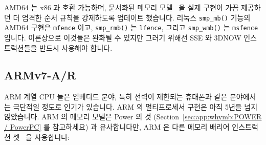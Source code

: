 AMD64 는 x86 과 호환 가능하며, 문서화된 메모리 모델~\cite{AMDOpteron:2:2007} 을
실제 구현이 가끔 제공하던 더 엄격한 순서 규칙을 강제하도록 업데이트 했습니다.
리눅스 {\tt smp\_mb()} 기능의 AMD64 구현은 {\tt mfence} 이고, {\tt smp\_rmb()}
는 {\tt lfence}, 그리고 {\tt smp\_wmb()} 는 {\tt msfence} 입니다.
이론상으로 이것들은 완화될 수 있지만 그러기 위해선 SSE 와 3DNOW 인스트럭션들을
반드시 사용해야 합니다.

\subsection{ARMv7-A/R}

ARM 계열 CPU 들은 임베디드 분야, 특히 전력이 제한되는 휴대폰과 같은 분야에서는
극단적일 정도로 인기가 있습니다.
ARM 의 멀티프로세서 구현은 아직 5년을 넘지 않았습니다.
ARM 의 메모리 모델은 Power 의 것 (Section~\ref{sec:app:whymb:POWER / PowerPC}
를 참고하세요) 과 유사합니다만, ARM 은 다른 메모리 배리어 인스트럭션
셋~\cite{ARMv7A:2010} 을 사용합니다:


